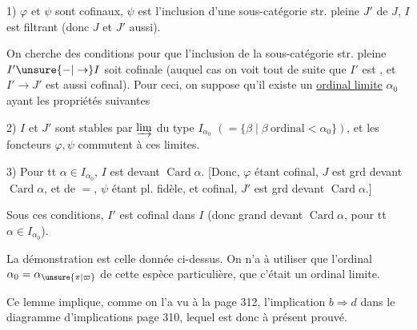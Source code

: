 1) $\varphi$ et $\psi$ sont cofinaux, $\psi$ est l'inclusion d'une sous-catégorie str. pleine $J'$ de $J$, $I$ est filtrant (donc $J$ et $J'$ aussi).

On cherche des conditions pour que l'inclusion  de la sous-catégorie str. pleine $I'\unsure{-|\to}I$ soit cofinale (auquel cas on voit tout de suite que $I'$ est , et $I'\to J'$ est aussi cofinal). Pour ceci, on suppose qu'il existe un \uline{ordinal limite} $\alpha_0$ ayant les propriétés  suivantes

2) $I$ et $J'$ sont stables par $\varinjlim$ du type $I_{\alpha_0}$ $(=\{\beta\mid\beta\ \text{ordinal}<\alpha_0\})$, et les foncteurs $\varphi,\psi$ commutent à ces limites.

3) Pour tt $\alpha\in I_{\alpha_0}$, $I$ est   devant $\operatorname{Card}\alpha$. [Donc, $\varphi$ étant cofinal, $J$ est  grd devant $\operatorname{Card}\alpha$, et de $=$, $\psi$ étant pl. fidèle, et cofinal, $J'$ est grd devant $\operatorname{Card}\alpha$.]

Sous ces conditions, $I'$ est cofinal dans $I$ (donc  grand devant $\operatorname{Card}\alpha$, pour tt $\alpha\in I_{\alpha_0}$).

La démonstration est celle donnée  ci-dessus. On n'a  à utiliser que l'ordinal $\alpha_0=\alpha_{\unsure{\pi|\varpi}}$  de cette espèce particulière,  que c'était un ordinal limite.


Ce lemme implique, comme on l'a vu à la page 312, l'implication $b\Longrightarrow d$ dans le diagramme d'implications  page 310, lequel est donc à présent prouvé.

